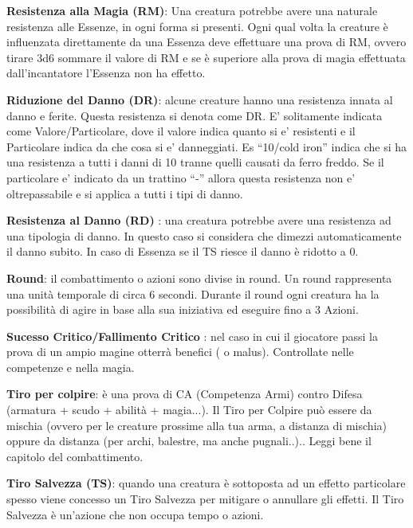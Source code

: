 \documentclass[a4paper,11pt,twoside,openany]{book}
\begin{document}
\textbf{Resistenza alla Magia (RM)}: Una creatura potrebbe avere una naturale resistenza alle Essenze, in ogni forma si presenti. Ogni qual volta la creature è influenzata direttamente da una Essenza deve effettuare una prova di RM, ovvero tirare 3d6 sommare il valore di RM e se è superiore alla prova di magia effettuata dall'incantatore l'Essenza non ha effetto.

\textbf{Riduzione del Danno (DR)}:   alcune creature hanno una resistenza innata al danno e ferite. Questa resistenza si denota come DR.
E’ solitamente indicata come Valore/Particolare, dove il valore indica quanto si e’ resistenti e il Particolare indica da che cosa si e’ danneggiati. Es “10/cold iron” indica che si ha una resistenza a tutti i danni di 10 tranne quelli causati da ferro freddo.
Se il particolare e’ indicato da un trattino “-” allora questa resistenza non e’ oltrepassabile e si applica a tutti i tipi di danno.

\textbf{Resistenza al Danno (RD)}  : una creatura potrebbe avere una resistenza ad una tipologia di danno. In questo caso si considera che dimezzi automaticamente il danno subito.
In caso di Essenza se il TS riesce il danno è ridotto a 0.

\textbf{Round}: il combattimento o azioni sono divise in round. Un round rappresenta una unità temporale di circa 6 secondi. Durante il round ogni creatura ha la possibilità di agire in base alla sua iniziativa ed eseguire fino a 3 Azioni.

\textbf{Sucesso Critico/Fallimento Critico} : nel caso in cui il giocatore passi la prova di un ampio magine otterrà benefici ( o malus). Controllate nelle competenze e nella magia.

\textbf{Tiro per colpire}: è una prova di CA (Competenza Armi) contro Difesa (armatura + scudo + abilità + magia...). Il Tiro per Colpire può essere da mischia (ovvero per le creature prossime alla tua arma, a distanza di mischia) oppure da distanza (per archi, balestre, ma anche pugnali..).. Leggi bene il capitolo del combattimento.

\textbf{Tiro Salvezza (TS)}: quando una creatura è sottoposta ad un effetto particolare spesso viene concesso un Tiro Salvezza per mitigare o annullare gli effetti. Il Tiro Salvezza è un'azione che non occupa tempo o azioni.
\end{document}
